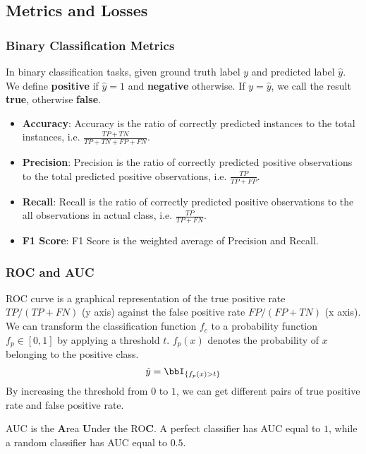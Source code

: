 \documentclass[beamer, en, version=2.0]{huangfusl-template}
\begin{document}
    \subsection{Metrics and Losses}

    \begin{frame}
        \frametitle{Binary Classification Metrics}

        In binary classification tasks, given ground truth label $y$ and predicted label $\hat y$. We define \textbf{positive} if $\hat y = 1$ and \textbf{negative} otherwise. If $y = \hat y$, we call the result \textbf{true}, otherwise \textbf{false}.

        \begin{itemize}
            \item \textbf{Accuracy}: Accuracy is the ratio of correctly predicted instances to the total instances, i.e. $\frac{TP + TN}{TP + TN + FP + FN}$.
            \item \textbf{Precision}: Precision is the ratio of correctly predicted positive observations to the total predicted positive observations, i.e. $\frac{TP}{TP + FP}$.
            \item \textbf{Recall}: Recall is the ratio of correctly predicted positive observations to the all observations in actual class, i.e. $\frac{TP}{TP + FN}$.
            \item \textbf{F1 Score}: F1 Score is the weighted average of Precision and Recall.
        \end{itemize}
    \end{frame}

    \begin{frame}
        \frametitle{ROC and AUC}

        ROC curve is a graphical representation of the true positive rate $TP / (TP + FN)$ (y axis) against the false positive rate $FP / (FP + TN)$ (x axis). We can transform the classification function $f_c$ to a probability function $f_p\in [0, 1]$ by applying a threshold $t$. $f_p(x)$ denotes the probability of $x$ belonging to the positive class.
        \begin{equation}
            \hat y = \bbI_{\{f_p(x) > t\}}
        \end{equation}
        By increasing the threshold from $0$ to $1$, we can get different pairs of true positive rate and false positive rate.

        AUC is the \textbf{A}rea \textbf{U}nder the RO\textbf{C}. A perfect classifier has AUC equal to $1$, while a random classifier has AUC equal to $0.5$.
    \end{frame}
\end{document}

